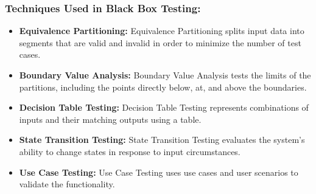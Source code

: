 \subsubsection{Techniques Used in Black Box Testing:}
\begin{itemize}
	\item \textbf{Equivalence Partitioning:} Equivalence Partitioning splits input data into segments that are valid and invalid in order to minimize the number of test cases.
	\item \textbf{Boundary Value Analysis:} Boundary Value Analysis tests the limits of the partitions, including the points directly below, at, and above the boundaries.
	\item \textbf{Decision Table Testing:} Decision Table Testing represents combinations of inputs and their matching outputs using a table.
	\item \textbf{State Transition Testing:} State Transition Testing evaluates the system's ability to change states in response to input circumstances.
	\item \textbf{Use Case Testing:} Use Case Testing uses use cases and user scenarios to validate the functionality.
\end{itemize}
